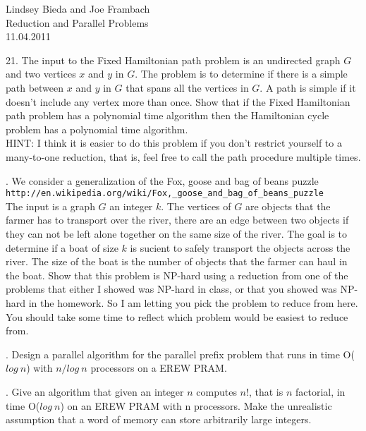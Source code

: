 \documentclass[10pt]{article}
\begin{document}
	\begin{flushright}
	Lindsey Bieda and Joe Frambach\\
	Reduction and Parallel Problems\\
	11.04.2011
	\end{flushright}

21. The input to the Fixed Hamiltonian path problem is an undirected graph $G$ and two vertices $x$ and $y$
in $G$. The problem is to determine if there is a simple path between $x$ and $y$ in $G$ that spans all the
vertices in $G$. A path is simple if it doesn't include any vertex more than once. Show that if the Fixed
Hamiltonian path problem has a polynomial time algorithm then the Hamiltonian cycle problem has
a polynomial time algorithm.\\
HINT: I think it is easier to do this problem if you don't restrict yourself to a many-to-one reduction,
that is, feel free to call the path procedure multiple times.

. We consider a generalization of the Fox, goose and bag of beans puzzle
\verb=http://en.wikipedia.org/wiki/Fox,_goose_and_bag_of_beans_puzzle= \\
The input is a graph $G$ an integer $k$. The vertices of $G$ are objects that the farmer has to transport
over the river, there are an edge between two objects if they can not be left alone together on the same
size of the river. The goal is to determine if a boat of size $k$ is sucient to safely transport the objects
across the river. The size of the boat is the number of objects that the farmer can haul in the boat.
Show that this problem is NP-hard using a reduction from one of the problems that either I showed
was NP-hard in class, or that you showed was NP-hard in the homework. So I am letting you pick the
problem to reduce from here. You should take some time to reflect which problem would be easiest to
reduce from.

. Design a parallel algorithm for the parallel prefix problem that runs in time O($log~n$) with $n/log~n$
processors on a EREW PRAM.

. Give an algorithm that given an integer $n$ computes $n!$, that is $n$ factorial, in time O($log~n$) on an
EREW PRAM with n processors. Make the unrealistic assumption that a word of memory can store
arbitrarily large integers.
\end{document}
